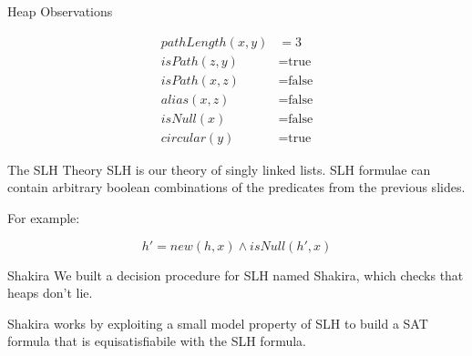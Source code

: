 \documentclass[xcolor=pdftex,t,11pt]{beamer}
\newcommand{\hpathlen}{\ensuremath{\mathit{pathLength}}\xspace}
\newcommand{\halloc}{\ensuremath{\mathit{new}}\xspace}
\newcommand{\halias}{\ensuremath{\mathit{alias}}\xspace}
\newcommand{\hisnull}{\ensuremath{\mathit{isNull}}\xspace}
\newcommand{\hispath}{\ensuremath{\mathit{isPath}}\xspace}
\newcommand{\hcircular}{\ensuremath{\mathit{circular}}\xspace}
\newcommand{\shakira}{{\sc Shakira}\xspace}
\begin{document}
\begin{frame}[fragile]{Heap Observations}

\begin{center}
\begin{minipage}[c]{.4\textwidth}
 \end{minipage}
 \begin{minipage}[c]{.4\textwidth}
 \vfill
 \begin{align*}
 \hpathlen(x, y) & =  3 \\
 \hispath(z, y) & = \text{true} \\
 \hispath(x, z) & = \text{false} \\
 \halias(x, z) & = \text{false} \\
 \hisnull(x) & = \text{false} \\
 \hcircular(y) & = \text{true}
 \end{align*}
 \vfill
 \end{minipage}
\end{center}
\end{frame}

\begin{frame}[fragile]{The SLH Theory}
 SLH is our theory of singly linked lists.  SLH formulae can contain arbitrary boolean combinations of the
 predicates from the previous slides.
 
 For example:
 
 \[
  h' = \halloc(h, x) \wedge \hisnull(h', x)
 \]

\end{frame}

\begin{frame}{\shakira}
 We built a decision procedure for SLH named \shakira, which checks that heaps don't lie.

 \pause 

 \shakira works by exploiting a small model property of SLH to build a SAT formula that is equisatisfiabile with the SLH formula.
\end{frame}
\end{document}
